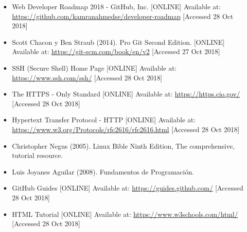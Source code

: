 \documentclass[a4paper]{article}
\begin{document}
\begin{itemize}
   \item Web Developer Roadmap 2018 - GitHub, Inc. [ONLINE] Available at:
      \url{https://github.com/kamranahmedse/developer-roadmap} [Accessed 28 Oct 2018]
\end{itemize}

\begin{itemize}
   \item Scott Chacon y Ben Straub (2014). Pro Git Second Edition. [ONLINE] Available at:
      \url{https://git-scm.com/book/en/v2} [Accessed 27 Oct 2018]
\end{itemize}

\begin{itemize}
   \item SSH (Secure Shell) Home Page [ONLINE] Available at:
      \url{https://www.ssh.com/ssh/} [Accessed 28 Oct 2018]
\end{itemize}

\begin{itemize}
   \item The HTTPS - Only Standard [ONLINE] Available at:
      \url{https://https.cio.gov/} [Accessed 28 Oct 2018]
\end{itemize}

\begin{itemize}
   \item Hypertext Transfer Protocol - HTTP [ONLINE] Available at:
      \url{https://www.w3.org/Protocols/rfc2616/rfc2616.html} [Accessed 28 Oct 2018]
\end{itemize}

\begin{itemize}
   \item Christopher Negus (2005). Linux Bible Ninth Edition, The comprehensive, tutorial resource.
\end{itemize}

\begin{itemize}
   \item Luis Joyanes Aguilar (2008). Fundamentos de Programación.
\end{itemize}

\begin{itemize}
   \item GitHub Guides [ONLINE] Available at:
      \url{https://guides.github.com/} [Accessed 28 Oct 2018]
\end{itemize}

\begin{itemize}
   \item HTML Tutorial [ONLINE] Available at:
      \url{https://www.w3schools.com/html/} [Accessed 28 Oct 2018]
\end{itemize}
\end{document}
